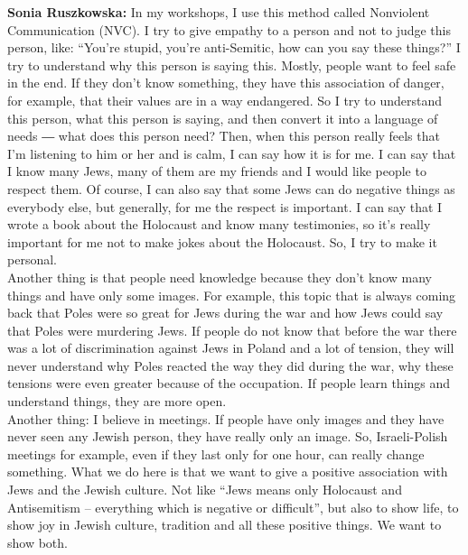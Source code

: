 \textbf{Sonia Ruszkowska:} In my workshops, I use this method called Nonviolent Communication (NVC). I try to give empathy to a person and not to judge this person, like: ``You’re stupid, you’re anti-Semitic, how can you say these things?'' I try to understand why this person is saying this. Mostly, people want to feel safe in the end. If they don’t know something, they have this association of danger, for example, that their values are in a way endangered. So I try to understand this person, what this person is saying, and then convert it into a language of needs ― what does this person need? Then, when this person really feels that I’m listening to him or her and is calm, I can say how it is for me. I can say that I know many Jews, many of them are my friends and I would like people to respect them. Of course, I can also say that some Jews can do negative things as everybody else, but generally, for me the respect is important. I can say that I wrote a book about the Holocaust and know many testimonies, so it’s really important for me not to make jokes about the Holocaust. So, I try to make it personal.\\ 
Another thing is that people need knowledge because they don’t know many things and have only some images. For example, this topic that is always coming back that Poles were so great for Jews during the war and how Jews could say that Poles were murdering Jews. If people do not know that before the war there was a lot of discrimination against Jews in Poland and a lot of tension, they will never understand why Poles reacted the way they did during the war, why these tensions were even greater because of the occupation. If people learn things and understand things, they are more open.\\  
Another thing: I believe in meetings. If people have only images and they have never seen any Jewish person, they have really only an image. So, Israeli-Polish meetings for example, even if they last only for one hour, can really change something. What we do here is that we want to give a positive association with Jews and the Jewish culture. Not like ``Jews means only Holocaust and Antisemitism – everything which is negative or difficult'', but also to show life, to show joy in Jewish culture, tradition and all these positive things. We want to show both. 


